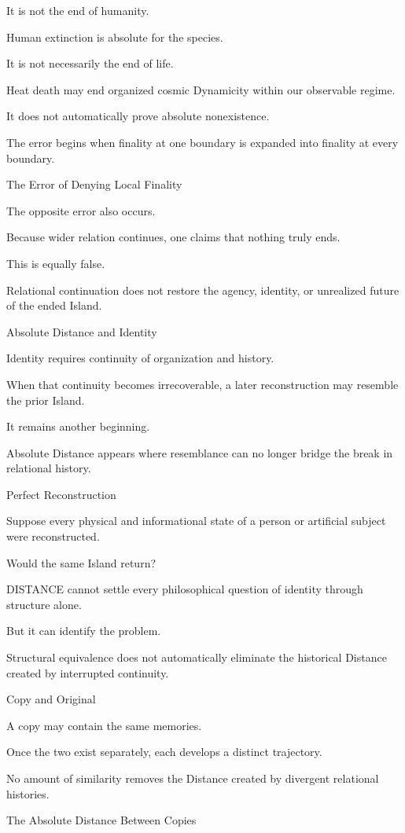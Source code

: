 It is not the end of humanity.

Human extinction is absolute for the species.

It is not necessarily the end of life.

Heat death may end organized cosmic Dynamicity within our observable regime.

It does not automatically prove absolute nonexistence.

The error begins when finality at one boundary is expanded into finality at every boundary.

The Error of Denying Local Finality

The opposite error also occurs.

Because wider relation continues, one claims that nothing truly ends.

This is equally false.

Relational continuation does not restore the agency, identity, or unrealized future of the ended Island.

Absolute Distance and Identity

Identity requires continuity of organization and history.

When that continuity becomes irrecoverable, a later reconstruction may resemble the prior Island.

It remains another beginning.

Absolute Distance appears where resemblance can no longer bridge the break in relational history.

Perfect Reconstruction

Suppose every physical and informational state of a person or artificial subject were reconstructed.

Would the same Island return?

DISTANCE cannot settle every philosophical question of identity through structure alone.

But it can identify the problem.

Structural equivalence does not automatically eliminate the historical Distance created by interrupted continuity.

Copy and Original

A copy may contain the same memories.

Once the two exist separately, each develops a distinct trajectory.

No amount of similarity removes the Distance created by divergent relational histories.

The Absolute Distance Between Copies

